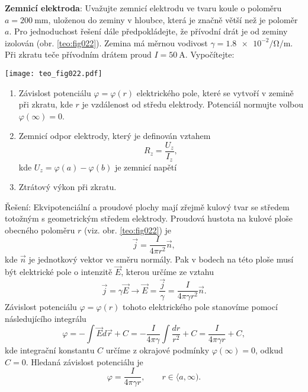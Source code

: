 \begin{example}
  \textbf{Zemnicí elektroda}: Uvažujte zemnicí elektrodu ve tvaru koule o poloměru  
  $a=\SI{200}{\mm}$, uloženou do zeminy v hloubce, která je značně větší než je poloměr $a$. Pro 
  jednoduchost řešení dále předpokládejte, že přívodní drát je od zeminy izolován (obr.
  \ref{teo:fig022}). Zemina má měrnou vodivost $\gamma=\num[exponent-product =
  \cdot]{1,8e-2}\si{\per\ohm\per\m}$. Při zkratu teče přívodním drátem proud $I=\SI{50}{\A}$.
  Vypočítejte:

  {\centering
   \captionsetup{type=figure}
   \texttt{[image: teo\_fig022.pdf]}
  \par}
  
  \begin{enumerate}[label=\emph{\alph*})]
    \item Závislost potenciálu $\varphi=\varphi(r)$ elektrického pole, které se vytvoří v
          zemině při zkratu, kde $r$ je vzdálenost od středu elektrody. Potenciál normujte
          volbou $\varphi(\infty)=0$.
    \item Zemnicí odpor elektrody, který je definován vztahem $$R_z=\frac{U_z}{I_z},$$ kde
          $U_z = \varphi(a)-\varphi(b)$ je zemnicí napětí 
    \item Ztrátový výkon při zkratu.
  \end{enumerate}
  Řešení:    
  Ekvipotenciální a proudové plochy mají zřejmě kulový tvar se středem totožným s geometrickým 
  středem elektrody. Proudová hustota na kulové ploše obecného poloměru $r$ (viz. obr. 
  \ref{teo:fig022}) je $$\vec{j}=\frac{I}{4\pi r^2}\vec{n},$$ kde $\vec{n}$ je 
  jednotkový vektor ve směru normály. Pak v bodech na této ploše musí být elektrické pole o 
  intenzitě $\vec{E}$, kterou určíme ze vztahu
  \begin{equation*}
    \vec{j}= \gamma\vec{E}\rightarrow\vec{E}=
    \frac{\vec{j}}{\gamma}=\frac{I}{4\pi\gamma r^2}\vec{n}.
  \end{equation*}
  Závislost potenciálu $\varphi=\varphi(r)$ tohoto elektrického pole stanovíme pomocí následujícího 
  integrálu
  \begin{equation}
    \varphi = - \int\vec{E}d\vec{r}+C = -\frac{I}{4\pi\gamma}\int\frac{dr}{r^2} + C 
            =   \frac{I}{4\pi\gamma r} + C, \nonumber
  \end{equation} 
  kde integrační konstantu $C$ určíme z okrajové podmínky $\varphi(\infty)=0$, odkud $C=0$.
  Hledaná závislost potenciálu je
  \begin{equation*}
    \varphi = \frac{I}{4\pi\gamma r}, \qquad r\in\langle a, \infty). 
  \end{equation*}           
  

\end{example}
